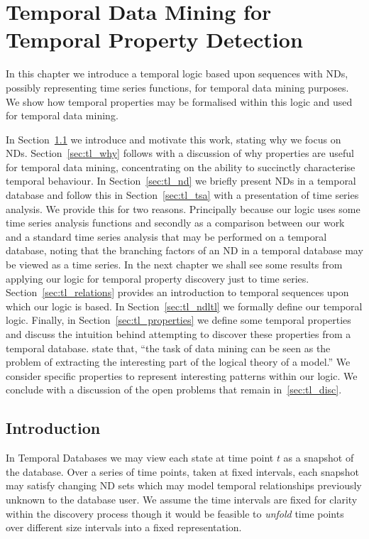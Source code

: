 \chapter{Temporal Data Mining for Temporal Property
Detection}\label{chap:templog}

In this chapter we introduce a temporal logic based upon sequences
with NDs, possibly representing time series functions, for temporal data
mining purposes. We show how temporal properties may be formalised
within this logic and used for temporal data mining.
\smallskip

In Section~\ref{sec:tl_intro} we introduce and motivate this
work, stating why we focus on NDs. Section~\ref{sec:tl_why} follows
with a discussion of why
properties are useful for temporal data mining, concentrating on the
ability to succinctly characterise temporal behaviour. In
Section~\ref{sec:tl_nd} we briefly present NDs in a temporal database
and follow this in Section~\ref{sec:tl_tsa} with a presentation of
time series analysis. We provide this for two reasons. Principally
because our logic uses some time series analysis functions and
secondly as a comparison between our work and a standard time series
analysis that may be performed on a temporal database, noting that the
branching factors of an ND
in a temporal database may be viewed as a time series. In the next
chapter we shall see some results from applying our logic for temporal
property discovery just to time series.  Section~\ref{sec:tl_relations}
provides an introduction to temporal sequences upon which our logic is
based. In Section~\ref{sec:tl_ndltl} we formally define our temporal
logic. Finally, in Section~\ref{sec:tl_properties} we define some temporal
properties and discuss the intuition behind attempting to discover
these properties from a temporal database. \cite{jmw96} state that,
``the task of data mining can be seen as the problem of extracting the
interesting part of the logical theory of a model.'' We consider
specific properties to represent interesting patterns within our logic.
We conclude with a
discussion of the open problems that remain in~\ref{sec:tl_disc}.

\section{Introduction}\label{sec:tl_intro}
In Temporal Databases we
may view each state at time point $t$ as a snapshot of the database. 
Over a series of time points, taken at fixed intervals, each snapshot 
may satisfy changing
ND sets which may model temporal relationships previously unknown to
the database user. We assume the time intervals are fixed for clarity
within the discovery process though it would be feasible to {\em unfold}
time points over different size intervals into a fixed representation.

